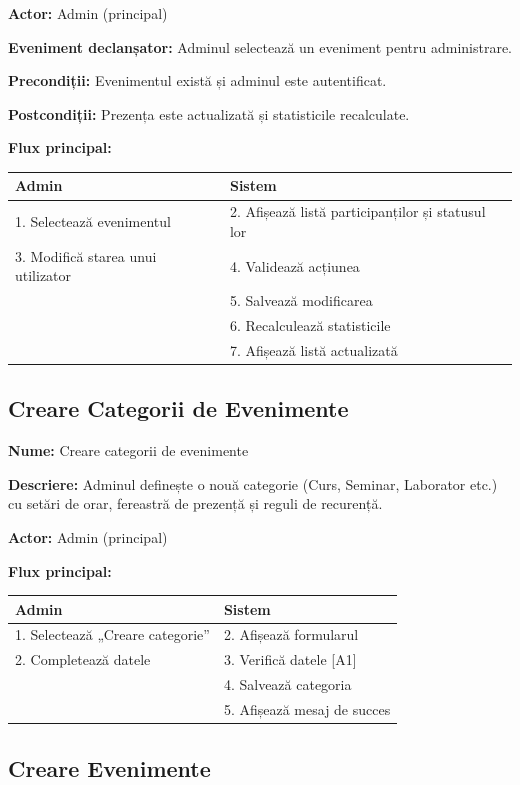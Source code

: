 \documentclass[a4paper,12pt,oneside]{report}
\begin{document}
\textbf{Actor:} Admin (principal)

\textbf{Eveniment declanșator:} Adminul selectează un eveniment pentru administrare.

\textbf{Precondiții:} Evenimentul există și adminul este autentificat.

\textbf{Postcondiții:} Prezența este actualizată și statisticile recalculate.

\textbf{Flux principal:}

\begin{tabular}{l l}
\hline
\textbf{Admin} & \textbf{Sistem} \\
\hline
1. Selectează evenimentul & 2. Afișează listă participanților și statusul lor \\
3. Modifică starea unui utilizator & 4. Validează acțiunea \\
 & 5. Salvează modificarea \\
 & 6. Recalculează statisticile \\
 & 7. Afișează listă actualizată \\
\hline
\end{tabular}


\subsection{Creare Categorii de Evenimente}

\textbf{Nume:} Creare categorii de evenimente

\textbf{Descriere:} Adminul definește o nouă categorie (Curs, Seminar, Laborator etc.) cu setări de orar, fereastră de prezență și reguli de recurență.

\textbf{Actor:} Admin (principal)

\textbf{Flux principal:}

\begin{tabular}{l l}
\hline
\textbf{Admin} & \textbf{Sistem} \\
\hline
1. Selectează „Creare categorie” & 2. Afișează formularul \\
2. Completează datele & 3. Verifică datele [A1] \\
 & 4. Salvează categoria \\
 & 5. Afișează mesaj de succes \\
\hline
\end{tabular}

\subsection{Creare Evenimente}
\end{document}
